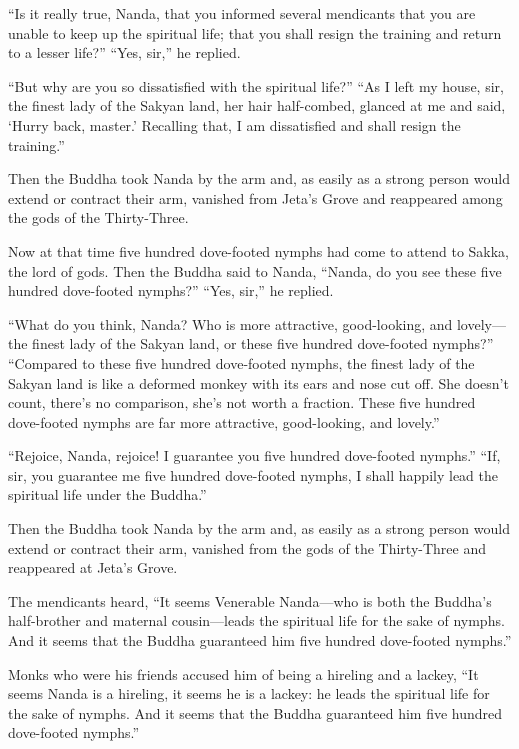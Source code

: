 \documentclass[12pt,openany]{book}%
\begin{document}
“Is it really true, Nanda, that you informed several mendicants that you are unable to keep up the spiritual life; that you shall resign the training and return to a lesser life?” “Yes, sir,” he replied. 

“But why are you so dissatisfied with the spiritual life?” “As I left my house, sir, the finest lady of the Sakyan land, her hair half-combed, glanced at me and said, ‘Hurry back, master.’ Recalling that, I am dissatisfied and shall resign the training.” 

Then the Buddha took Nanda by the arm and, as easily as a strong person would extend or contract their arm, vanished from Jeta’s Grove and reappeared among the gods of the Thirty-Three. 

Now at that time five hundred dove-footed nymphs had come to attend to Sakka, the lord of gods. Then the Buddha said to Nanda, “Nanda, do you see these five hundred dove-footed nymphs?” “Yes, sir,” he replied. 

“What do you think, Nanda? Who is more attractive, good-looking, and lovely—the finest lady of the Sakyan land, or these five hundred dove-footed nymphs?” “Compared to these five hundred dove-footed nymphs, the finest lady of the Sakyan land is like a deformed monkey with its ears and nose cut off. She doesn’t count, there’s no comparison, she’s not worth a fraction. These five hundred dove-footed nymphs are far more attractive, good-looking, and lovely.” 

“Rejoice, Nanda, rejoice! I guarantee you five hundred dove-footed nymphs.” “If, sir, you guarantee me five hundred dove-footed nymphs, I shall happily lead the spiritual life under the Buddha.” 

Then the Buddha took Nanda by the arm and, as easily as a strong person would extend or contract their arm, vanished from the gods of the Thirty-Three and reappeared at Jeta’s Grove. 

The mendicants heard, “It seems Venerable Nanda—who is both the Buddha’s half-brother and maternal cousin—leads the spiritual life for the sake of nymphs. And it seems that the Buddha guaranteed him five hundred dove-footed nymphs.” 

Monks who were his friends accused him of being a hireling and a lackey, “It seems Nanda is a hireling, it seems he is a lackey: he leads the spiritual life for the sake of nymphs. And it seems that the Buddha guaranteed him five hundred dove-footed nymphs.” 
\end{document}

